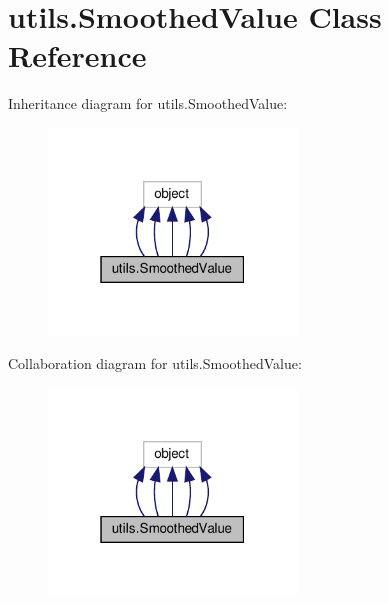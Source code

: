 \hypertarget{classutils_1_1SmoothedValue}{}\section{utils.\+Smoothed\+Value Class Reference}
\label{classutils_1_1SmoothedValue}


Inheritance diagram for utils.\+Smoothed\+Value\+:
\nopagebreak
\begin{figure}[H]
\begin{center}
\leavevmode
\includegraphics[width=187pt]{classutils_1_1SmoothedValue__inherit__graph}
\end{center}
\end{figure}


Collaboration diagram for utils.\+Smoothed\+Value\+:
\nopagebreak
\begin{figure}[H]
\begin{center}
\leavevmode
\includegraphics[width=187pt]{classutils_1_1SmoothedValue__coll__graph}
\end{center}
\end{figure}
